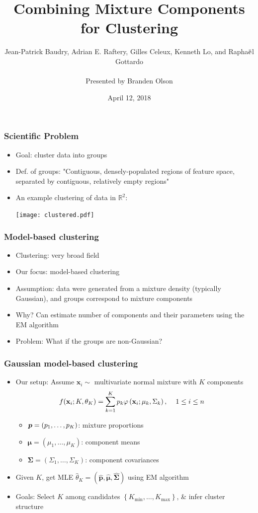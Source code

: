 \documentclass[mathserif,compress]{beamer}
\title[]{Combining Mixture Components for Clustering}
\author[]
{Jean-Patrick Baudry, Adrian E. Raftery, Gilles Celeux, Kenneth Lo, and Rapha$\ddot{\text e}$l Gottardo\\$\;$ \\Presented by Branden Olson}
\date[April, 2018]
{April 12, 2018}
\institute[]
{
}
\newcommand*\reals{\mathbb{R}}
\newcommand*\htab{\hspace{4 mm}}
\newcommand*\ba{\[ \begin{aligned}}
\newcommand*\ea{\end{aligned} \]}
\newcommand*\set[1]{\left\{#1\right\}}
\newcommand*\estim[1]{\widehat{#1}}
\renewcommand\;{\,}
\renewcommand\phi{\varphi}
\newcommand{\bx}{\mathbf{x}}
\newcommand{\bp}{\mbox{\protect\boldmath $p$}}
\begin{document}
\begin{frame}[noframenumbering]
  \titlepage
\end{frame}

\begin{frame}\frametitle{Scientific Problem}
\begin{itemize}
\item[]
Goal: \alert{cluster} data into groups
\medskip
\item[]
Def. of \alert{groups}: "Contiguous, densely-populated regions of feature space, separated by contiguous, relatively empty regions"
\medskip
\item[]
An example clustering of data in $\reals^2$:
\smallskip
\begin{center}
\texttt{[image: clustered.pdf]}
\end{center}
\end{itemize}
\end{frame}

\begin{frame}\frametitle{Model-based clustering}
\begin{itemize}
\item[]
Clustering: very broad field
\bigskip
\item[]
Our focus: \alert{model-based clustering}
\bigskip
\item[]
Assumption: data were generated from a mixture density (typically Gaussian), and groups correspond to mixture components
\bigskip
\item[]
Why? Can estimate number of components and their parameters using the EM algorithm
\bigskip
\item[]
Problem: What if the groups are non-Gaussian?
\end{itemize}
\end{frame}

\begin{frame}\frametitle{Gaussian model-based clustering}
\begin{itemize}
\item[]
Our setup: Assume $\bx_i \sim$ \alert{multivariate normal mixture} with $K$ components
\ba
f(\bx_i ; K, \theta_K) 
	& = \sum_{k=1}^K p_k
		\phi \left(\bx_i ; \mu_k, \Sigma_k\right),
		\htab
		1 \le i \le n
\ea
\begin{itemize}
\item
$\bp = (p_1, \dotsc, p_K)$: mixture proportions
\medskip
\item
$\pmb\mu = (\mu_1, \dotsc, \mu_K)$: component means
\medskip
\item
$\pmb\Sigma = (\Sigma_1, \dotsc, \Sigma_K)$: component covariances
\end{itemize}
\bigskip
\item[]
Given $K$, get MLE 
$\estim\theta_K = (\estim{\mathbf p}, \estim{\pmb\mu}, \estim{\pmb\Sigma})$ using EM algorithm
\bigskip
\item[]
Goals: \alert{Select $K$} among candidates $\set{K_\text{min}, \dotsc, K_\text{max}}$,  \& \alert{infer cluster structure}
\medskip
\end{itemize}
\end{frame}
\end{document}
